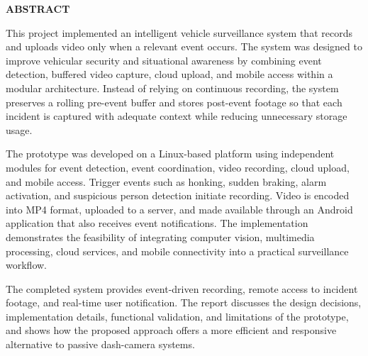 \vspace*{50pt}




\begin{center}
\textbf{ABSTRACT}\\
\end{center}
%
\newenvironment{Abstract}
\vspace{20pt}
This project implemented an intelligent vehicle surveillance system that records and uploads video only when a relevant event occurs. The system was designed to improve vehicular security and situational awareness by combining event detection, buffered video capture, cloud upload, and mobile access within a modular architecture. Instead of relying on continuous recording, the system preserves a rolling pre-event buffer and stores post-event footage so that each incident is captured with adequate context while reducing unnecessary storage usage.\par
The prototype was developed on a Linux-based platform using independent modules for event detection, event coordination, video recording, cloud upload, and mobile access. Trigger events such as honking, sudden braking, alarm activation, and suspicious person detection initiate recording. Video is encoded into MP4 format, uploaded to a server, and made available through an Android application that also receives event notifications. The implementation demonstrates the feasibility of integrating computer vision, multimedia processing, cloud services, and mobile connectivity into a practical surveillance workflow.\par
The completed system provides event-driven recording, remote access to incident footage, and real-time user notification. The report discusses the design decisions, implementation details, functional validation, and limitations of the prototype, and shows how the proposed approach offers a more efficient and responsive alternative to passive dash-camera systems.

\begin{flushright}
	
\end{flushright}

\thispagestyle{plain}

